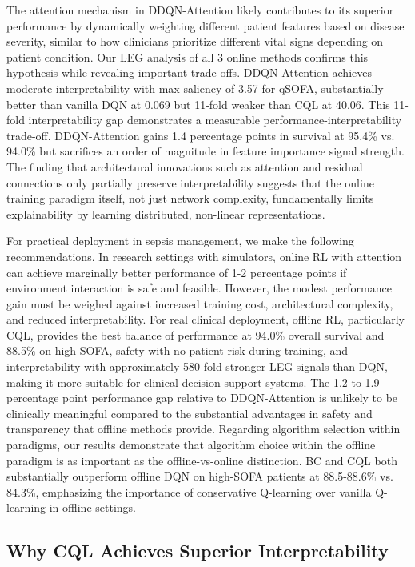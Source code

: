 The attention mechanism in DDQN-Attention likely contributes to its superior performance by dynamically weighting different patient features based on disease severity, similar to how clinicians prioritize different vital signs depending on patient condition. Our LEG analysis of all 3 online methods confirms this hypothesis while revealing important trade-offs. DDQN-Attention achieves moderate interpretability with max saliency of 3.57 for qSOFA, substantially better than vanilla DQN at 0.069 but 11-fold weaker than CQL at 40.06. This 11-fold interpretability gap demonstrates a measurable performance-interpretability trade-off. DDQN-Attention gains 1.4 percentage points in survival at 95.4\% vs. 94.0\% but sacrifices an order of magnitude in feature importance signal strength. The finding that architectural innovations such as attention and residual connections only partially preserve interpretability suggests that the online training paradigm itself, not just network complexity, fundamentally limits explainability by learning distributed, non-linear representations.

For practical deployment in sepsis management, we make the following recommendations. In research settings with simulators, online RL with attention can achieve marginally better performance of 1-2 percentage points if environment interaction is safe and feasible. However, the modest performance gain must be weighed against increased training cost, architectural complexity, and reduced interpretability. For real clinical deployment, offline RL, particularly CQL, provides the best balance of performance at 94.0\% overall survival and 88.5\% on high-SOFA, safety with no patient risk during training, and interpretability with approximately 580-fold stronger LEG signals than DQN, making it more suitable for clinical decision support systems. The 1.2 to 1.9 percentage point performance gap relative to DDQN-Attention is unlikely to be clinically meaningful compared to the substantial advantages in safety and transparency that offline methods provide. Regarding algorithm selection within paradigms, our results demonstrate that algorithm choice within the offline paradigm is as important as the offline-vs-online distinction. BC and CQL both substantially outperform offline DQN on high-SOFA patients at 88.5-88.6\% vs. 84.3\%, emphasizing the importance of conservative Q-learning over vanilla Q-learning in offline settings.


\subsection{Why CQL Achieves Superior Interpretability}\label{sec:discussion:mechanism}

